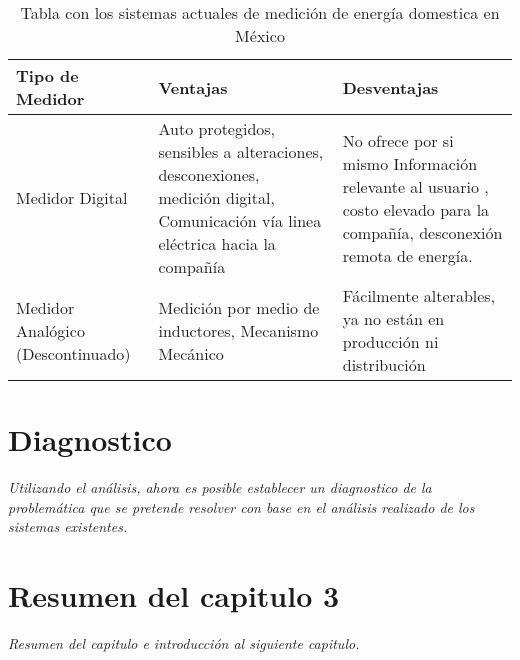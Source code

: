     \begin{table}[H]
    \centering
    \begin{tabular}{| m{3.8cm} | m{7.3cm}| m{6.2cm} |} 
    \hline
    
    Tipo de Medidor & Ventajas & Desventajas\\
    \hline\hline
    Medidor Digital & Auto protegidos, sensibles a alteraciones, desconexiones, medición digital, Comunicación vía linea  eléctrica hacia la compañía & No ofrece por si mismo Información relevante al usuario , costo elevado para la compañía, desconexión remota de energía. \\
    \hline
    Medidor Analógico (Descontinuado)& Medición por medio de inductores, Mecanismo Mecánico & Fácilmente alterables, ya no están en producción ni distribución\\
    \hline
    \end{tabular}
     \caption{Tabla con los sistemas actuales de medición de energía domestica en México}
     \label{tblsistemas}
    \end{table}

\section{ Diagnostico }

\textit{Utilizando el análisis, ahora es posible establecer un diagnostico de la problemática que se pretende resolver con base en el análisis realizado de los sistemas existentes.}

\section{ Resumen del capitulo 3 }

\textit{Resumen del capitulo e introducción al siguiente capitulo.}